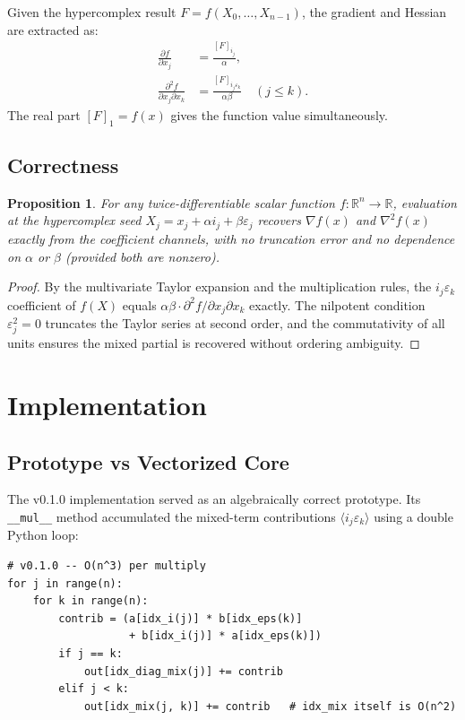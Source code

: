 \documentclass[11pt]{article}
\newtheorem{proposition}{Proposition}
\begin{document}
Given the hypercomplex result $F = f(X_0, \ldots, X_{n-1})$, the gradient and Hessian
are extracted as:
\begin{align}
  \frac{\partial f}{\partial x_j} &= \frac{[F]_{i_j}}{\alpha}, \\
  \frac{\partial^2 f}{\partial x_j \partial x_k} &=
    \frac{[F]_{i_j\varepsilon_k}}{\alpha\beta} \quad (j \leq k).
\end{align}
The real part $[F]_1 = f(x)$ gives the function value simultaneously.

\subsection{Correctness}

\begin{proposition}
For any twice-differentiable scalar function $f:\mathbb{R}^n \to \mathbb{R}$,
evaluation at the hypercomplex seed $X_j = x_j + \alpha i_j + \beta\varepsilon_j$
recovers $\nabla f(x)$ and $\nabla^2 f(x)$ exactly from the coefficient channels,
with no truncation error and no dependence on $\alpha$ or $\beta$ (provided both
are nonzero).
\end{proposition}

\begin{proof}
By the multivariate Taylor expansion and the multiplication rules, the
$i_j\varepsilon_k$ coefficient of $f(X)$ equals $\alpha\beta \cdot \partial^2 f /
\partial x_j \partial x_k$ exactly. The nilpotent condition $\varepsilon_j^2 = 0$
truncates the Taylor series at second order, and the commutativity of all units
ensures the mixed partial is recovered without ordering ambiguity.
\end{proof}

\section{Implementation}

\subsection{Prototype vs Vectorized Core}

The v0.1.0 implementation served as an algebraically correct prototype.
Its \texttt{\_\_mul\_\_} method accumulated the mixed-term contributions
$\langle i_j \varepsilon_k \rangle$ using a double Python loop:

\begin{lstlisting}
# v0.1.0 -- O(n^3) per multiply
for j in range(n):
    for k in range(n):
        contrib = (a[idx_i(j)] * b[idx_eps(k)]
                   + b[idx_i(j)] * a[idx_eps(k)])
        if j == k:
            out[idx_diag_mix(j)] += contrib
        elif j < k:
            out[idx_mix(j, k)] += contrib   # idx_mix itself is O(n^2)
\end{lstlisting}
\end{document}

